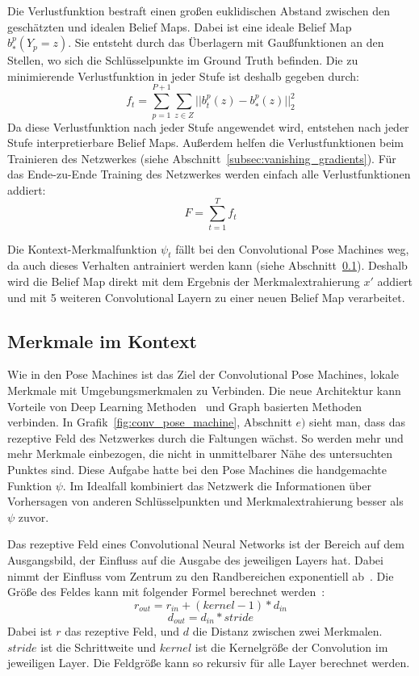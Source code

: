 \documentclass[journal, a4paper]{IEEEtran}
\begin{document}
        Die Verlustfunktion bestraft einen großen euklidischen Abstand zwischen den geschätzten und idealen Belief Maps. Dabei ist eine ideale Belief Map $b_{*}^{p}(Y_p = z)$. Sie entsteht durch das Überlagern mit Gaußfunktionen an den Stellen, wo sich die Schlüsselpunkte im Ground Truth befinden. %
        Die zu minimierende Verlustfunktion in jeder Stufe ist deshalb gegeben durch:
        \[ f_t = \sum_{p=1}^{P+1} \sum_{z \in Z} ||b_{t}^{p}(z) - b_{*}^{p}(z) ||_{2}^{2}\]
        Da diese Verlustfunktion nach jeder Stufe angewendet wird, entstehen nach jeder Stufe interpretierbare Belief Maps. Außerdem helfen die Verlustfunktionen beim Trainieren des Netzwerkes (siehe Abschnitt~\ref{subsec:vanishing_gradients}). Für das Ende-zu-Ende Training des Netzwerkes werden einfach alle Verlustfunktionen addiert:
        \[ F = \sum_{t=1}^{T} f_t \]


        Die Kontext-Merkmalfunktion $\psi_t$ fällt bei den Convolutional Pose Machines weg, da auch dieses Verhalten antrainiert werden kann (siehe Abschnitt~\ref{subsec:kontext}). Deshalb wird die Belief Map direkt mit dem Ergebnis der Merkmalextrahierung $x'$ addiert und mit 5 weiteren Convolutional Layern zu einer neuen Belief Map verarbeitet. 

\subsection{Merkmale im Kontext}\label{subsec:kontext}
        Wie in den Pose Machines ist das Ziel der Convolutional Pose Machines, lokale Merkmale mit Umgebungsmerkmalen zu Verbinden. Die neue Architektur kann Vorteile von Deep Learning Methoden~\cite{TODO} und Graph basierten Methoden~\cite{TODO} verbinden. %
        In Grafik~\ref{fig:conv_pose_machine}, Abschnitt $e)$ sieht man, dass das rezeptive Feld des Netzwerkes durch die Faltungen wächst. So werden mehr und mehr Merkmale einbezogen, die nicht in unmittelbarer Nähe des untersuchten Punktes sind. Diese Aufgabe hatte bei den Pose Machines die handgemachte Funktion $\psi$. Im Idealfall kombiniert das Netzwerk die Informationen über Vorhersagen von anderen Schlüsselpunkten und Merkmalextrahierung besser als $\psi$ zuvor.

        Das rezeptive Feld eines Convolutional Neural Networks ist der Bereich auf dem Ausgangsbild, der Einfluss auf die Ausgabe des jeweiligen Layers hat. Dabei nimmt der Einfluss vom Zentrum zu den Randbereichen exponentiell ab~\cite{A guide to convolution arithmetic for deep learning}. 
        Die Größe des Feldes kann mit folgender Formel berechnet werden~\cite{A guide to convolution arithmetic for deep learning}:
        \[ r_{out} = r_{in} + (kernel-1) * d_{in}\]
        \[ d_{out} = d_{in} * stride\]
        Dabei ist $r$ das rezeptive Feld, und $d$ die Distanz zwischen zwei Merkmalen. $stride$ ist die Schrittweite und $kernel$ ist die Kernelgröße der Convolution im jeweiligen Layer. Die Feldgröße kann so rekursiv für alle Layer berechnet werden.
        
\end{document}
